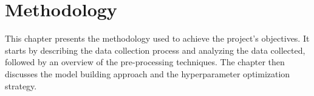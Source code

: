 \chapter{Methodology}
This chapter presents the methodology used to achieve the project's objectives.
It starts by describing the data collection process and analyzing the data collected,
followed by an overview of the pre-processing techniques.
The chapter then discusses the model building approach and the hyperparameter optimization strategy.






